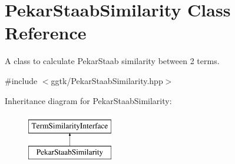 \hypertarget{classPekarStaabSimilarity}{}\section{Pekar\+Staab\+Similarity Class Reference}
\label{classPekarStaabSimilarity}


A class to calculate Pekar\+Staab similarity between 2 terms.  




{\ttfamily \#include $<$ggtk/\+Pekar\+Staab\+Similarity.\+hpp$>$}

Inheritance diagram for Pekar\+Staab\+Similarity\+:\begin{figure}[H]
\begin{center}
\leavevmode
\includegraphics[height=2.000000cm]{classPekarStaabSimilarity}
\end{center}
\end{figure}
